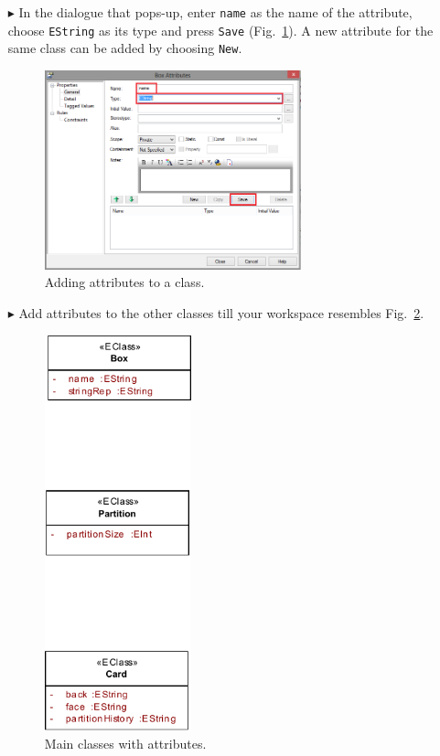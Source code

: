 \begin{enumerate}
\item[$\blacktriangleright$] In the dialogue that pops-up, enter \texttt{name} as the name of the attribute, choose \texttt{EString} as its type and press \texttt{Save} (Fig.~\ref{fig:attribute_properties}).
A new attribute for the same class can be added by choosing \texttt{New}.

\begin{figure}[htbp]
	\centering
  \includegraphics[width=0.7\textwidth]{pics/memBoxBilder/memBox13.png}
	\caption{Adding attributes to a class.}
	\label{fig:attribute_properties}
\end{figure}

\item[$\blacktriangleright$] Add attributes to the other classes till your workspace resembles
Fig.~\ref{fig:attribute_completed}.

\begin{figure}[htbp]
	\centering
  \includegraphics[width=0.4\textwidth]{pics/memBoxBilder/memBox14.pdf}
	\caption{Main classes with attributes.}
	\label{fig:attribute_completed}
\end{figure}


\end{enumerate}
